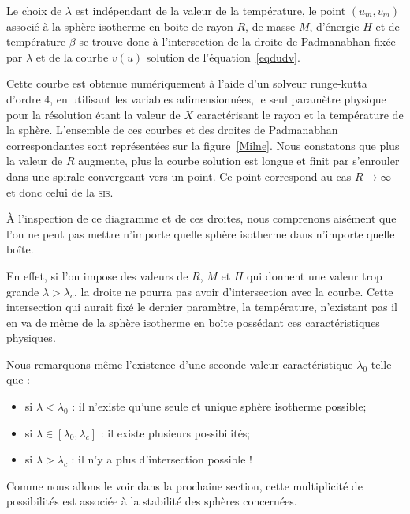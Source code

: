	Le choix de $\lambda$ est indépendant de la valeur de la température, le point $(u_m,v_m)$ associé à la sphère
	isotherme en boite de rayon $R$, de masse $M$, d'énergie $H$ et de température $\beta$ se trouve donc à
	l'intersection de la droite de Padmanabhan fixée par $\lambda$ et de la courbe $v(u)$ solution de
	l'équation~\ref{eqdudv}. 
	
	
	Cette courbe est obtenue numériquement à l'aide d'un solveur runge-kutta d'ordre 4, en utilisant les variables adimensionnées, le
	seul paramètre physique pour la résolution étant la valeur de $X$ caractérisant le rayon et la température de la
	sphère.  L'ensemble de ces courbes et des droites de Padmanabhan correspondantes sont représentées sur la figure~\ref{Milne}.
	Nous constatons que plus la valeur de $R$ augmente, plus la courbe
	solution est longue et finit par s'enrouler dans une spirale convergeant vers un point. Ce point correspond au
	cas $R\to\infty$ et donc celui de la \textsc{sis}.
	
	À l'inspection de ce diagramme et de ces droites, nous comprenons aisément que l'on ne peut pas mettre
	n'importe quelle sphère isotherme dans n'importe quelle boîte. %

	En effet, si l'on impose des valeurs de $R$,
	$M$ et $H$ qui donnent une valeur trop grande $\lambda>\lambda_c$, la droite ne pourra pas avoir d'intersection
	avec la courbe. Cette intersection qui aurait fixé le dernier paramètre, la température, n'existant pas il en va
	de même de la sphère isotherme en boîte possédant ces caractéristiques physiques.
	
	Nous remarquons même l'existence d'une seconde valeur caractéristique $\lambda_0$ telle que :
	\begin{itemize}
		\item si $\lambda < \lambda_0$ : il n'existe qu'une seule et unique sphère isotherme possible;
		\item si $\lambda \in \left[\lambda_0,\lambda_c\right]$ : il existe plusieurs possibilités;
		\item si $\lambda > \lambda_c$ : il n'y a plus d'intersection possible !
	\end{itemize}

Comme nous allons le voir dans la prochaine section, cette multiplicité de possibilités est associée à la stabilité des sphères concernées.

